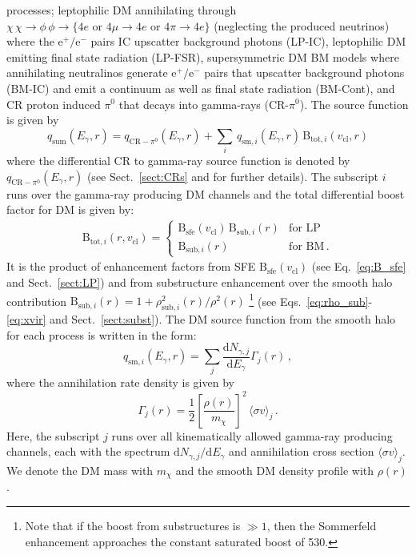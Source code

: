 \documentclass[10pt,aps,pra,reprint,amsmath,amsfonts,amssymb,showpacs,nofootinbib,floatfix]{revtex4-1}
\newcommand{\rmn}{\mathrm}
\newcommand{\sfe}{\rmn{sfe}}
\newcommand{\sub}{\rmn{sub}}
\newcommand{\B}{\rmn{B}}
\newcommand{\qCR}{q_{\rmn{CR}-\ensuremath{\pi^0}}}
\newcommand{\dd}{\rmn{d}}
\newcommand{\mx}{\ensuremath{m_{\chi}}}
\newcommand{\ngammaj}{\ensuremath{N_{\gamma,j}}}
\newcommand{\sigmaannv}{\ensuremath{\langle\sigma v\rangle}}
\newcommand{\sigv}{v_\rmn{cl}}
\newcommand{\egamma}{\ensuremath{E_{\gamma}}}
\newcommand{\eg}{E_\gamma}
\begin{document}
processes; leptophilic DM annihilating through
$\chi\,\chi\to\phi\,\phi\to\{4e\mbox{~or~}4\mu\to4e
\mbox{~or~}4\pi\to4e\}$ (neglecting the produced neutrinos) where the
$\rmn{e}^+/\rmn{e}^-$ pairs IC upscatter background photons (LP-IC),
leptophilic DM emitting final state radiation (LP-FSR), supersymmetric
DM BM models where annihilating neutralinos generate
$\rmn{e}^+/\rmn{e}^-$ pairs that upscatter background photons (BM-IC)
and emit a continuum as well as final state radiation (BM-Cont), and
CR proton induced $\pi^0$ that decays into gamma-rays
(CR-$\pi^0$). The source function is given by
\begin{equation}
q_\rmn{sum} (\eg,r) = \qCR(\eg,r)+
\sum_i \,q_{\rmn{sm},i}(\eg,r)\,\B_{\rmn{tot},i}(\sigv,r)
\end{equation}
where the differential CR to gamma-ray source function is denoted
by $\qCR(\eg,r)$ (see Sect.~\ref{sect:CRs} and
\cite{2010MNRAS.409..449P} for further details). The subscript $i$
runs over the gamma-ray producing DM channels and the total
differential boost factor for DM is given by:
\begin{eqnarray}
\B_{\rmn{tot},i}(r,\sigv) = \left\{\begin{array}{cc}
\B_\sfe(\sigv)\,\B_{\sub,i}(r) &\rmn{for\,\,LP}\\
\B_{\sub,i}(r) &\rmn{for\,\,BM\,.}\end{array}\right.
\end{eqnarray}
It is the product of enhancement factors from SFE $\B_\sfe(\sigv)$
(see Eq.~\ref{eq:B_sfe} and Sect.~\ref{sect:LP}) and from substructure
enhancement over the smooth halo contribution $\B_{\sub,i}(r) =
1+\rho_{\sub,i}^2(r)/\rho^2(r)$ \footnote{Note that if the boost
    from substructures is $\gg 1$, then the Sommerfeld enhancement
    approaches the constant saturated boost of 530.} (see
Eqs.~\ref{eq:rho_sub}-\ref{eq:xvir} and Sect.~\ref{sect:subst}).  The
DM source function from the smooth halo for each process is written in
the form:
\begin{equation}
\label{eq:q_sm}
q_{\rmn{sm},i} (\egamma,r) = \sum_j
\frac{\dd \ngammaj}{\dd E_\gamma} \Gamma_j(r)\,,
\end{equation}
where the annihilation rate density is given by 
\begin{equation}
\label{eq:ann_rate}
\Gamma_j(r) = \frac{1}{2} \left[\frac{\rho(r)}{\mx}\right]^2 
\, \sigmaannv_j\,.
\end{equation}
Here, the subscript $j$ runs over all kinematically allowed gamma-ray
producing channels, each with the spectrum $\dd
  \ngammaj /\dd\eg$ and annihilation cross section $\sigmaannv_j$.
We denote the DM mass with $\mx$ and the smooth DM density profile
with $\rho(r)$.
\end{document}
